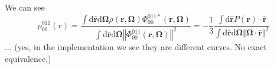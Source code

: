 We can see
\begin{equation}
\rho_{00}^{011}(r)=\dfrac{\int\mathrm{d}\hat{\mathbf{r}}\mathrm{d}\mathbf{\Omega}\rho(\mathbf{r},\mathbf{\Omega})\Phi_{00}^{011*}(\mathbf{r},\mathbf{\Omega})}{\int\mathrm{d}\hat{\mathbf{r}}\mathrm{d}\mathbf{\Omega}\left\Vert \Phi_{00}^{011}(\mathbf{r},\mathbf{\Omega})\right\Vert ^{2}}=-\dfrac{1}{3}\dfrac{\int\mathrm{d}\hat{\mathbf{r}}P(\mathbf{r})\cdot\hat{\mathbf{r}}}{\int\mathrm{d}\hat{\mathbf{r}}\mathrm{d}\mathbf{\Omega}\left\Vert \mathbf{\Omega}\cdot\hat{\mathbf{r}}\right\Vert ^{2}}
\end{equation}
... (yes, in the implementation we see they are different curves.
No exact equivalence.)
